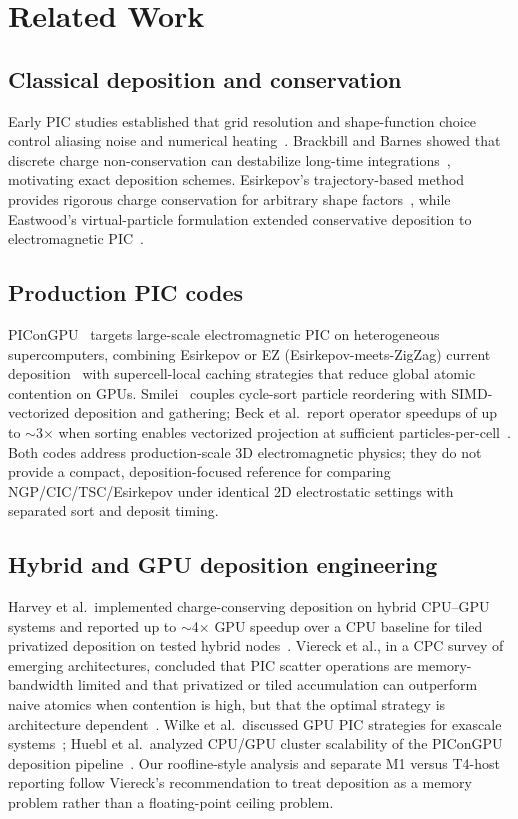 \section{Related Work}
\label{sec:related}

\subsection{Classical deposition and conservation}
Early PIC studies established that grid resolution and shape-function choice control aliasing noise and numerical heating~\cite{langdon1970,okuda1972}.
Brackbill and Barnes showed that discrete charge non-conservation can destabilize long-time integrations~\cite{brackbill1980}, motivating exact deposition schemes.
Esirkepov's trajectory-based method provides rigorous charge conservation for arbitrary shape factors~\cite{esirkepov2001}, while Eastwood's virtual-particle formulation extended conservative deposition to electromagnetic PIC~\cite{eastwood1981}.

\subsection{Production PIC codes}
PIConGPU~\cite{burau2010,huebl2019} targets large-scale electromagnetic PIC on heterogeneous supercomputers, combining Esirkepov or EZ (Esirkepov-meets-ZigZag) current deposition~\cite{steiniger2023} with supercell-local caching strategies that reduce global atomic contention on GPUs.
Smilei~\cite{derouillat2018} couples cycle-sort particle reordering with SIMD-vectorized deposition and gathering; Beck et al.\ report operator speedups of up to $\sim$3$\times$ when sorting enables vectorized projection at sufficient particles-per-cell~\cite{beck2019}.
Both codes address production-scale 3D electromagnetic physics; they do not provide a compact, deposition-focused reference for comparing NGP/CIC/TSC/Esirkepov under identical 2D electrostatic settings with separated sort and deposit timing.

\subsection{Hybrid and GPU deposition engineering}
Harvey et al.\ implemented charge-conserving deposition on hybrid CPU--GPU systems and reported up to $\sim$4$\times$ GPU speedup over a CPU baseline for tiled privatized deposition on tested hybrid nodes~\cite{harvey2015}.
Viereck et al., in a CPC survey of emerging architectures, concluded that PIC scatter operations are memory-bandwidth limited and that privatized or tiled accumulation can outperform naive atomics when contention is high, but that the optimal strategy is architecture dependent~\cite{viereck2016}.
Wilke et al.\ discussed GPU PIC strategies for exascale systems~\cite{wilke2017}; Huebl et al.\ analyzed CPU/GPU cluster scalability of the PIConGPU deposition pipeline~\cite{huebl2014}.
Our roofline-style analysis and separate M1 versus T4-host reporting follow Viereck's recommendation to treat deposition as a memory problem rather than a floating-point ceiling problem.

